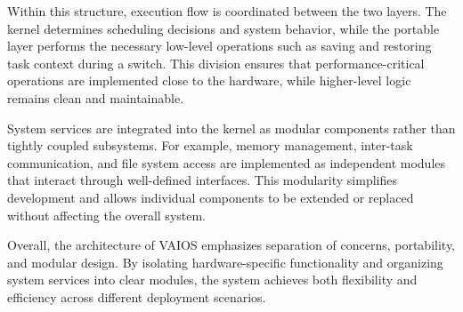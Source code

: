 Within this structure, execution flow is coordinated between the two layers. The kernel determines scheduling decisions and system behavior, while the portable layer performs the necessary low-level operations such as saving and restoring task context during a switch. This division ensures that performance-critical operations are implemented close to the hardware, while higher-level logic remains clean and maintainable.

System services are integrated into the kernel as modular components rather than tightly coupled subsystems. For example, memory management, inter-task communication, and file system access are implemented as independent modules that interact through well-defined interfaces. This modularity simplifies development and allows individual components to be extended or replaced without affecting the overall system.

Overall, the architecture of VAIOS emphasizes separation of concerns, portability, and modular design. By isolating hardware-specific functionality and organizing system services into clear modules, the system achieves both flexibility and efficiency across different deployment scenarios.